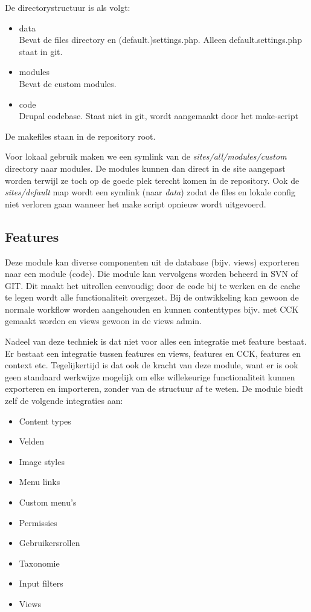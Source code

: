 De directorystructuur is als volgt:

\begin{itemize}
\item data \\
    Bevat de files directory en (default.)settings.php. Alleen default.settings.php staat in git.
\item modules \\
    Bevat de custom modules.
\item code \\
    Drupal codebase. Staat niet in git, wordt aangemaakt door het make-script
\end{itemize}

De makefiles staan in de repository root.

Voor lokaal gebruik maken we een symlink van de \emph{sites/all/modules/custom} directory naar {modules}. De modules kunnen dan direct in de site aangepast worden terwijl ze toch op de goede plek terecht komen in de repository. Ook de \emph{sites/default} map wordt een symlink (naar \emph{data}) zodat de files en lokale config niet verloren gaan wanneer het make script opnieuw wordt uitgevoerd.

\subsection{Features}

Deze module kan diverse componenten uit de database (bijv. views) exporteren naar een  module (code). Die module kan vervolgens worden beheerd in SVN of GIT. Dit maakt het uitrollen eenvoudig; door de code bij te werken en de cache te legen wordt alle functionaliteit overgezet. Bij de ontwikkeling kan gewoon de normale workflow worden aangehouden en kunnen contenttypes bijv. met CCK gemaakt worden en views gewoon in de views admin.

Nadeel van deze techniek is dat niet voor alles een integratie met feature bestaat. Er bestaat een integratie tussen features en views, features en CCK, features en context etc. Tegelijkertijd is dat ook de kracht van deze module, want er is ook geen standaard werkwijze mogelijk om elke willekeurige functionaliteit kunnen exporteren en importeren, zonder van de structuur af te weten. De module biedt zelf de volgende integraties aan:

\begin{itemize}
  \item Content types
  \item Velden
  \item Image styles
  \item Menu links
  \item Custom menu's
  \item Permissies
  \item Gebruikersrollen
  \item Taxonomie
  \item Input filters
  \item Views
\end{itemize}

